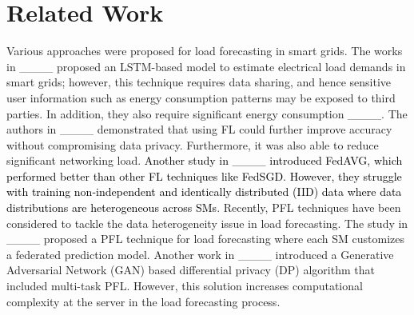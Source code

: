 \section{Related Work}
Various approaches were proposed for load forecasting in smart grids. The works in ____ proposed an LSTM-based model to estimate electrical load demands in smart grids; however, this technique requires data sharing, and hence sensitive user information such as energy consumption patterns may be exposed to third parties. In addition, they also require significant energy consumption ____. The authors in ____ demonstrated that using FL could further improve accuracy without compromising data privacy. Furthermore, it was also able to reduce significant networking load. \textcolor{black}{Another study in ____ introduced FedAVG, which performed better than other FL techniques like FedSGD. However, they struggle with training non-independent and identically distributed (IID) data where data distributions are heterogeneous across SMs}. Recently, PFL techniques have been considered to tackle the data heterogeneity issue in load forecasting. The study in ____ proposed a PFL technique for load forecasting where each SM customizes a federated prediction model. Another work in ____ introduced a Generative Adversarial Network (GAN) based differential privacy (DP) algorithm that included multi-task PFL. However, this solution increases computational complexity at the server in the load forecasting process. 


